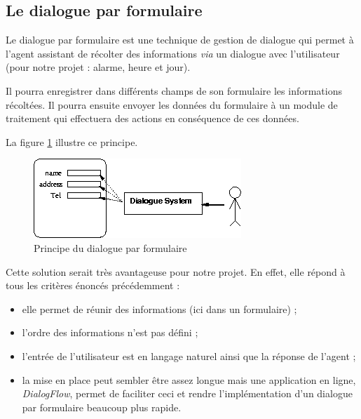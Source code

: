 \FloatBarrier

\subsection{Le dialogue par formulaire}
Le dialogue par formulaire est une technique de gestion de dialogue qui permet à l'agent assistant de récolter des informations \emph{via} un dialogue avec l'utilisateur (pour notre projet : alarme, heure et jour). 

Il pourra enregistrer dans différents champs de son formulaire les informations récoltées. Il pourra ensuite envoyer les données du formulaire à un module de traitement qui effectuera des actions en conséquence de ces données.

La figure \ref{form-dialog} illustre ce principe.
\begin{figure}[H]
\centering
    \includegraphics[scale=0.7]{images/slot.png} %
    \caption{Principe du dialogue par formulaire}
    \label{form-dialog}
\end{figure}

Cette solution serait très avantageuse pour notre projet. 
En effet, elle répond à tous les critères énoncés précédemment : 
\begin{itemize}
    \item elle permet de réunir des informations (ici dans un formulaire) ;
    \item l'ordre des informations n'est pas défini ;
    \item l'entrée de l'utilisateur est en langage naturel ainsi que la réponse de l'agent ;
    \item la mise en place peut sembler être assez longue mais une application en ligne, \textit{DialogFlow}, permet de faciliter ceci et rendre l'implémentation d'un dialogue par formulaire beaucoup plus rapide.
\end{itemize}



